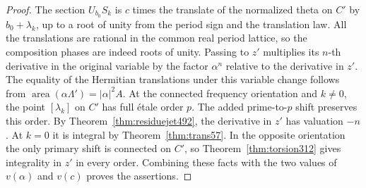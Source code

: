 \documentclass[a4paper,11pt]{article}
\theoremstyle{definition}
\theoremstyle{remark}
\numberwithin{equation}{section}
\begin{document}
\begin{proof}
The section \(U_{b_0}S_k\) is \(c\) times the translate of
the normalized theta on \(C'\) by \(b_0+\lambda_k\), up to a
root of unity from the period sign and the translation law.
All the translations are rational in the common real period
lattice, so the composition phases are indeed roots of unity.
Passing to \(z'\) multiplies its \(n\)-th derivative in the
original variable by the factor \(\alpha^n\) relative to
the derivative in \(z'\). The equality of the Hermitian
translations under this variable change follows from
\(\operatorname{area}(\alpha\Lambda')=|\alpha|^2A\).
At the connected frequency orientation and \(k\ne0\), the
point \([\lambda_k]\) on \(C'\) has full \'etale order \(p\).
The added prime-to-\(p\) shift preserves this order. By
Theorem~\ref{thm:residuejet492}, the derivative in \(z'\)
has valuation \(-n\). At \(k=0\) it is integral by
Theorem~\ref{thm:trans57}. In the opposite orientation the
only primary shift is connected on \(C'\), so
Theorem~\ref{thm:torsion312} gives integrality in \(z'\)
in every order. Combining these facts with the two values
of \(v(\alpha)\) and \(v(c)\) proves the assertions.
\end{proof}

\clearpage
\end{document}
